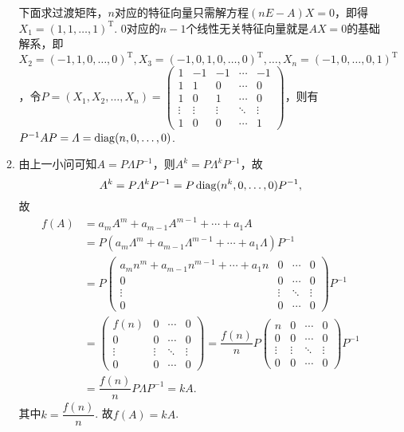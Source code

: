 \begin{enumerate}
\begin{enumerate}
                    下面求过渡矩阵，$n$对应的特征向量只需解方程$(nE-A)X=0$，即得$X_1=(1,1,\ldots,1)^\mathrm{T}$. 0对应的$n-1$个线性无关特征向量就是$AX=0$的基础解系，即$X_2=(-1,1,0,\ldots,0)^\mathrm{T},X_3=(-1,0,1,0,\ldots,0)^\mathrm{T},\ldots,X_n=(-1,0,\ldots,0,1)^\mathrm{T}$，令$P=(X_1,X_2,\ldots,X_n)=\begin{pmatrix}
                            1 & -1 & -1 & \cdots & -1 \\ 1 & 1 & 0 & \cdots & 0 \\ 1 & 0 & 1 & \cdots & 0 \\ \vdots & \vdots & \vdots & \ddots & \vdots \\ 1 & 0 & 0 & \cdots & 1
                        \end{pmatrix}$，则有$P^{-1}AP=\varLambda=\operatorname{diag}(n,0,\ldots,0)$.

              \item 由上一小问可知$A=P\varLambda P^{-1}$，则$A^k=P\varLambda^kP^{-1}$，故
                    \[A^k=P\varLambda^kP^{-1}=P\operatorname{diag}(n^k,0,\ldots,0)P^{-1},\]
                    故
                    \begin{align*}
                        f(A) & =a_mA^m+a_{m-1}A^{m-1}+\cdots+a_1A                                                               \\
                             & =P(a_m\varLambda^m+a_{m-1}\varLambda^{m-1}+\cdots+a_1\varLambda)P^{-1}                           \\
                             & =P\begin{pmatrix}
                                     a_mn^m+a_{m-1}n^{m-1}+\cdots+a_1n & 0 & \cdots & 0 \\ 0 & 0 & \cdots & 0 \\ \vdots & \vdots & \ddots & \vdots \\ 0 & 0 & \cdots & 0
                                 \end{pmatrix}P^{-1} \\
                             & =\begin{pmatrix}
                                    f(n) & 0 & \cdots & 0 \\ 0 & 0 & \cdots & 0 \\ \vdots & \vdots & \ddots & \vdots \\ 0 & 0 & \cdots & 0
                                \end{pmatrix}=\dfrac{f(n)}{n}P\begin{pmatrix}
                                                                  n & 0 & \cdots & 0 \\ 0 & 0 & \cdots & 0 \\ \vdots & \vdots & \ddots & \vdots \\ 0 & 0 & \cdots & 0
                                                              \end{pmatrix}P^{-1}    \\
                             & =\dfrac{f(n)}{n}P\varLambda P^{-1}=kA.
                    \end{align*}
                    其中$k=\dfrac{f(n)}{n}$. 故$f(A)=kA$.


\end{enumerate}
\end{enumerate}
